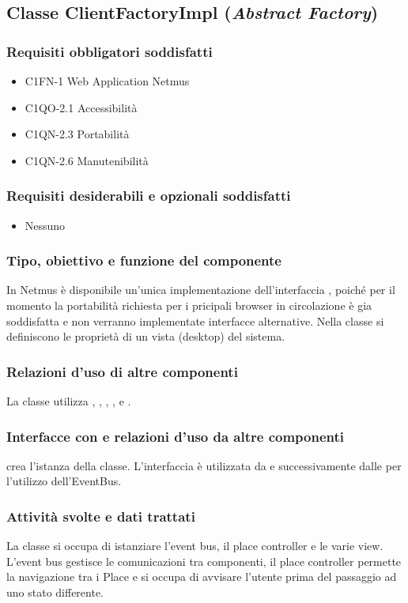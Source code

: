 \subsection{Classe ClientFactoryImpl (\emph{Abstract Factory})}
\subsubsection*{Requisiti obbligatori soddisfatti}
\begin{itemize}
    \item C1FN-1 Web Application Netmus
    \item C1QO-2.1 Accessibilit\`a
    \item C1QN-2.3 Portabilit\`a
    \item C1QN-2.6 Manutenibilit\`a
\end{itemize}
\subsubsection*{Requisiti desiderabili e opzionali soddisfatti}
\begin{itemize}
	\item Nessuno
\end{itemize}
\subsubsection*{Tipo, obiettivo e funzione del componente}
In Netmus \`e disponibile un'unica implementazione dell'interfaccia
, poich\'e per il momento la portabilit\`a richiesta per i
pricipali browser in circolazione \`e gia soddisfatta e non verranno
implementate interfacce alternative. Nella classe si definiscono
le propriet\`a di un vista (desktop) del sistema.
\subsubsection*{Relazioni d'uso di altre componenti}
La classe utilizza , , ,
,  e
.
\subsubsection*{Interfacce con e relazioni d'uso da altre componenti}
 crea l'istanza della classe. L'interfaccia  \`e
utilizzata da  e successivamente dalle  per
l'utilizzo dell'EventBus.
\subsubsection*{Attivit\`a svolte e dati trattati}
La classe si occupa di istanziare l'event bus, il place controller e le varie
view. L'event bus gestisce le comunicazioni tra componenti, il place
controller permette la navigazione tra i Place e si occupa di avvisare
l'utente prima del passaggio ad uno stato differente.


